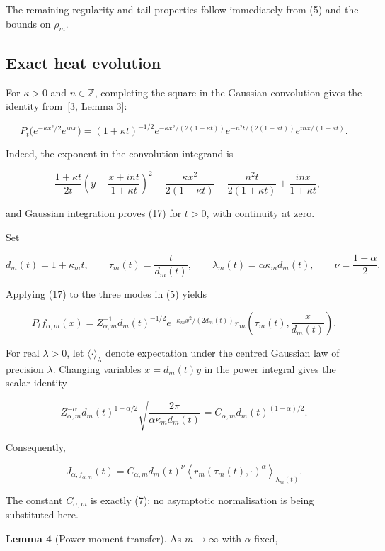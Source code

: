 \documentclass[
  11pt,
]{article}
\begin{document}
The remaining regularity and tail properties follow immediately from (5)
and the bounds on \(\rho_m\).

\subsection{Exact heat evolution}\label{exact-heat-evolution}

For \(\kappa>0\) and \(n\in\mathbb Z\), completing the square in the
Gaussian convolution gives the identity
from~\href{https://arxiv.org/abs/2608.30275v1}{{[}3, Lemma 3{]}}:

\[
\tag{17}
 P_t\big(e^{-\kappa x^2/2}e^{inx}\big)
 =(1+\kappa t)^{-1/2}
  e^{-\kappa x^2/(2(1+\kappa t))}
  e^{-n^2t/(2(1+\kappa t))}e^{inx/(1+\kappa t)}.
\]

Indeed, the exponent in the convolution integrand is

\[
-\frac{1+\kappa t}{2t}
   \left(y-\frac{x+int}{1+\kappa t}\right)^2
 -\frac{\kappa x^2}{2(1+\kappa t)}
 -\frac{n^2t}{2(1+\kappa t)}+\frac{inx}{1+\kappa t},
\]

and Gaussian integration proves (17) for \(t>0\), with continuity at
zero.

Set

\[
\tag{18}
 d_m(t)=1+\kappa_mt,\qquad
 \tau_m(t)=\frac{t}{d_m(t)},\qquad
 \lambda_m(t)=\alpha\kappa_m d_m(t),\qquad
 \nu=\frac{1-\alpha}{2}.
\]

Applying (17) to the three modes in (5) yields

\[
\tag{19}
 P_tf_{\alpha,m}(x)=Z_{\alpha,m}^{-1}d_m(t)^{-1/2}
 e^{-\kappa_mx^2/(2d_m(t))}
 r_m\!\left(\tau_m(t),\frac{x}{d_m(t)}\right).
\]

For real \(\lambda>0\), let \(\langle\cdot\rangle_\lambda\) denote
expectation under the centred Gaussian law of precision \(\lambda\).
Changing variables \(x=d_m(t)y\) in the power integral gives the scalar
identity

\[
Z_{\alpha,m}^{-\alpha}d_m(t)^{1-\alpha/2}
 \sqrt{\frac{2\pi}{\alpha\kappa_m d_m(t)}}
 =C_{\alpha,m}d_m(t)^{(1-\alpha)/2}.
\]

Consequently,

\[
\tag{20}
 J_{\alpha,f_{\alpha,m}}(t)
 =C_{\alpha,m}d_m(t)^\nu
  \left\langle r_m(\tau_m(t),\cdot)^\alpha
  \right\rangle_{\lambda_m(t)}.
\]

The constant \(C_{\alpha,m}\) is exactly (7); no asymptotic
normalisation is being substituted here.

\textbf{Lemma 4} (Power-moment transfer). As \(m\to\infty\) with
\(\alpha\) fixed,
\end{document}

